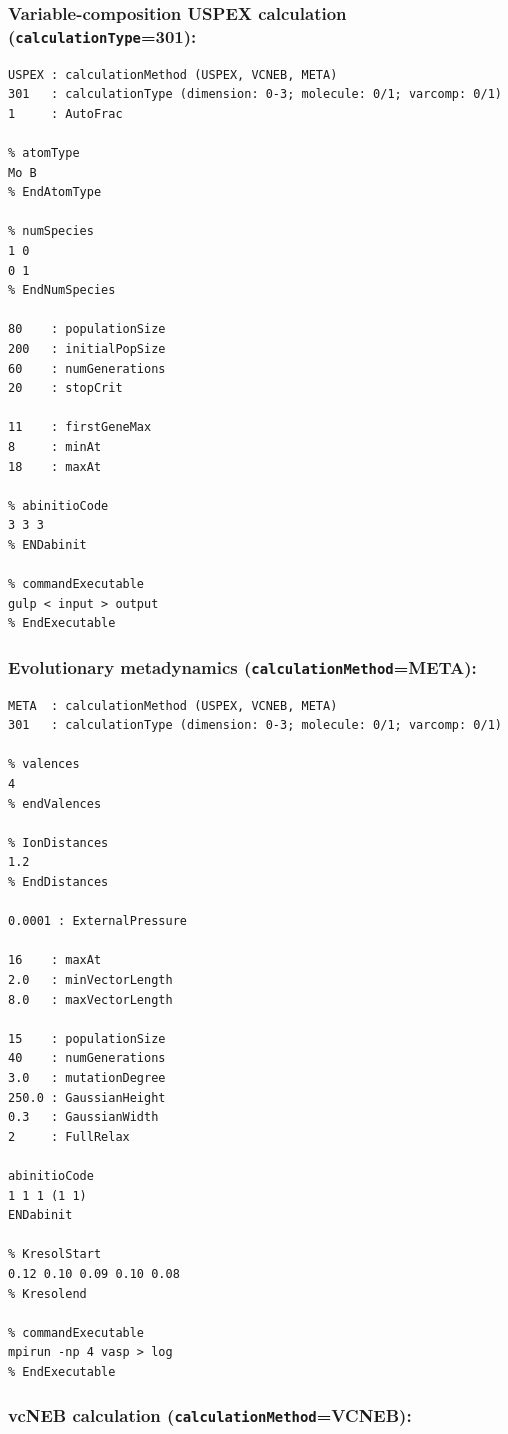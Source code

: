 \documentclass[12pt]{article}
\newcommand{\keyword}[1]{\texttt{#1}}
\begin{document}
\newpage
\subsubsection{Variable-composition USPEX calculation
(\keyword{calculationType}=301):}

\lstset{language=MATLAB, frame=single, basicstyle=\small}
\begin{lstlisting}
USPEX : calculationMethod (USPEX, VCNEB, META)
301   : calculationType (dimension: 0-3; molecule: 0/1; varcomp: 0/1)
1     : AutoFrac

% atomType
Mo B
% EndAtomType

% numSpecies
1 0
0 1
% EndNumSpecies

80    : populationSize
200   : initialPopSize
60    : numGenerations 
20    : stopCrit

11    : firstGeneMax 
8     : minAt
18    : maxAt

% abinitioCode 
3 3 3
% ENDabinit

% commandExecutable
gulp < input > output
% EndExecutable
\end{lstlisting}


\newpage
\subsubsection{Evolutionary metadynamics (\keyword{calculationMethod}=META):}

\lstset{language=MATLAB, frame=single, basicstyle=\small}
\begin{lstlisting}
META  : calculationMethod (USPEX, VCNEB, META)
301   : calculationType (dimension: 0-3; molecule: 0/1; varcomp: 0/1)

% valences
4
% endValences

% IonDistances
1.2
% EndDistances

0.0001 : ExternalPressure

16    : maxAt
2.0   : minVectorLength 
8.0   : maxVectorLength

15    : populationSize
40    : numGenerations
3.0   : mutationDegree
250.0 : GaussianHeight
0.3   : GaussianWidth
2     : FullRelax

abinitioCode 
1 1 1 (1 1)
ENDabinit

% KresolStart
0.12 0.10 0.09 0.10 0.08
% Kresolend

% commandExecutable
mpirun -np 4 vasp > log
% EndExecutable
\end{lstlisting}

\newpage
\subsubsection{vcNEB calculation
(\keyword{calculationMethod}=VCNEB):}
\end{document}
